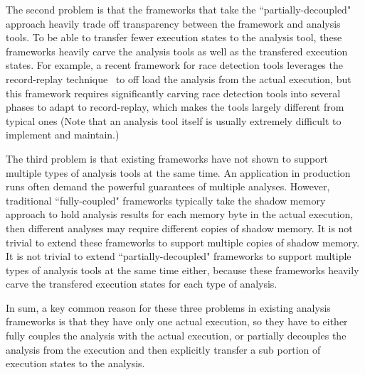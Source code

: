 The second problem is that the frameworks that take the ``partially-decoupled" 
approach heavily trade off transparency between the framework and analysis 
tools. To be able to transfer fewer execution states to the analysis tool, 
these frameworks heavily carve the analysis tools as well as the transfered 
execution states. For example, a recent framework for race detection tools 
leverages the record-replay technique~\cite{scribe:sigmetrics2010, 
respec:asplos10, racepro:sosp11} to off load the analysis from the actual 
execution, but this framework requires significantly carving race detection 
tools into several phases to adapt to record-replay, which makes the tools 
largely different from typical ones (Note that an analysis tool itself is 
usually extremely difficult to implement and maintain.)


The third problem is that existing frameworks have not shown to support 
multiple types of analysis tools at the same time. An application in 
production runs often demand the powerful guarantees of multiple analyses. 
However, traditional ``fully-coupled" frameworks typically take the shadow 
memory approach to hold analysis results for each memory byte in the actual 
execution, then different analyses may require different copies of 
shadow memory. It is not trivial to extend these frameworks to support multiple 
copies of shadow memory. It is not trivial to extend ``partially-decoupled" 
frameworks to support multiple types of analysis tools at the same time either, 
because these frameworks heavily carve the transfered execution states for each 
type of analysis.


In sum, a key common reason for these three problems in existing analysis 
frameworks is that they have only one actual execution, so they have to either 
fully couples the analysis with the actual execution, or partially decouples 
the analysis from the execution and then explicitly transfer a sub portion of 
execution states to the analysis.






